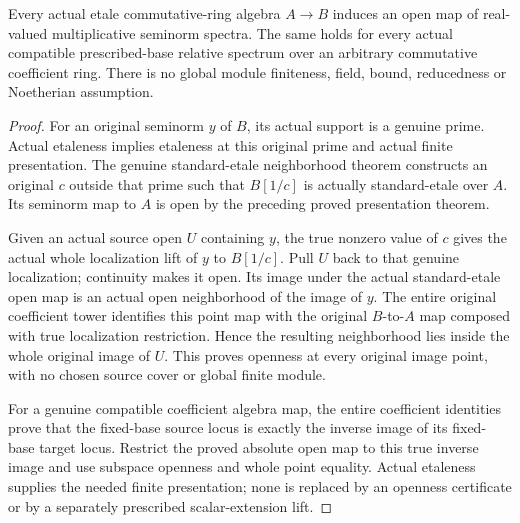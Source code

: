 \begin{theorem}
\label{spectrum:actual-general-etale-open-map}
\leanok
{}
Every actual etale commutative-ring algebra $A\to B$ induces an open
map of real-valued multiplicative seminorm spectra. The same holds
for every actual compatible prescribed-base relative spectrum over
an arbitrary commutative coefficient ring. There is no global module
finiteness, field, bound, reducedness or Noetherian assumption.
\end{theorem}
\begin{proof}
For an original seminorm $y$ of $B$, its actual support is a genuine
prime. Actual etaleness implies etaleness at this original prime and
actual finite presentation. The genuine standard-etale neighborhood
theorem constructs an original $c$ outside that prime such that
$B[1/c]$ is actually standard-etale over $A$. Its seminorm map to
$A$ is open by the preceding proved presentation theorem.

Given an actual source open $U$ containing $y$, the true nonzero
value of $c$ gives the actual whole localization lift of $y$ to
$B[1/c]$. Pull $U$ back to that genuine localization; continuity
makes it open. Its image under the actual standard-etale open map is
an actual open neighborhood of the image of $y$. The entire original
coefficient tower identifies this point map with the original
$B$-to-$A$ map composed with true localization restriction. Hence
the resulting neighborhood lies inside the whole original image of
$U$. This proves openness at every original image point, with no
chosen source cover or global finite module.

For a genuine compatible coefficient algebra map, the entire
coefficient identities prove that the fixed-base source locus is
exactly the inverse image of its fixed-base target locus. Restrict
the proved absolute open map to this true inverse image and use
subspace openness and whole point equality. Actual etaleness supplies
the needed finite presentation; none is replaced by an openness
certificate or by a separately prescribed scalar-extension lift.
\end{proof}

